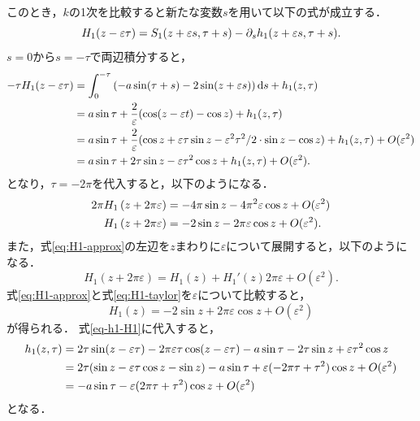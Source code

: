 \documentclass[../main]{subfiles}
\begin{document}
    このとき，$k$の1次を比較すると新たな変数$s$を用いて以下の式が成立する．
    \begin{equation}
        H_1(z-\varepsilon \tau)=S_1(z+\varepsilon s,\tau+s)-\partial_s h_1(z+\varepsilon s,\tau+s).
    \end{equation}
    $s=0$から$s=-\tau$で両辺積分すると，
    \begin{align}
        -\tau H_1(z-\varepsilon \tau)&=\int_0^{-\tau}\left(-a\sin(\tau+s)-2\sin(z+\varepsilon s)\right)\dd{s}+h_1(z,\tau)\notag \\
        &=a \sin\tau+\frac{2}{\varepsilon}(\cos (z-\varepsilon t)-\cos  z)+h_1(z,\tau)\notag\\
        &=a \sin\tau+\frac{2}{\varepsilon}(\cos z+\varepsilon \tau\sin z-\varepsilon^2\tau^2/2\cdot\sin z-\cos z)+h_1(z,\tau)+O(\varepsilon^2)\notag\\
        &=a \sin\tau+2\tau\sin z-\varepsilon \tau^2\cos z+h_1(z,\tau)+O(\varepsilon^2).
        \label{eq-h1-H1}
    \end{align}
    となり，$\tau=-2\pi$を代入すると，以下のようになる．
    \begin{align}
        2\pi H_1\left(z+ 2\pi\varepsilon\right)&=-4\pi\sin z-4\pi^2\varepsilon \cos z+O(\varepsilon^2)\notag\\
        H_1\left(z+2\pi\varepsilon\right)&=-2 \sin z-2\pi\varepsilon \cos z+O(\varepsilon^2).\label{eq:H1-approx}
    \end{align}
    また，式\eqref{eq:H1-approx}の左辺を$z$まわりに$\varepsilon$について展開すると，以下のようになる．
    \begin{equation}
        H_1\left(z+2\pi\varepsilon\right)=H_1(z)+H_1'(z) 2\pi\varepsilon+O(\varepsilon^2).
        \label{eq:H1-taylor}
    \end{equation}
    式\eqref{eq:H1-approx}と式\eqref{eq:H1-taylor}を$\varepsilon$について比較すると，
    \begin{equation}
        \label{eq:nit-H1}
        H_1(z)=-2\sin z+2\pi\varepsilon \cos z+O(\varepsilon^2)
    \end{equation}
    が得られる．
    式\eqref{eq-h1-H1}に代入すると，
    \begin{align}
        h_1(z,\tau)&=2\tau\sin(z-\varepsilon \tau)-2\pi\varepsilon \tau\cos(z-\varepsilon \tau)-a\sin\tau-2\tau\sin z+\varepsilon \tau^2\cos z\notag\\
        &=2\tau(\sin z-\varepsilon \tau\cos z-\sin z)-a\sin\tau+\varepsilon(-2\pi \tau+\tau^2)\cos z+O(\varepsilon^2)\notag\\
        &=-a\sin\tau-\varepsilon(2\pi \tau+\tau^2)\cos z+O(\varepsilon^2)
    \end{align}
    となる．
\end{document}
